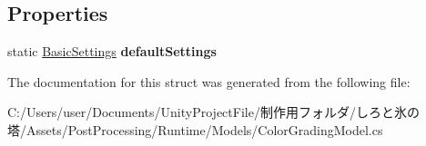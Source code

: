 \subsection*{Properties}
\begin{DoxyCompactItemize}
\item 
\mbox{\label{struct_unity_engine_1_1_post_processing_1_1_color_grading_model_1_1_basic_settings_a3c6d62a952263436102ea72c64701adc}} 
static \hyperlink{struct_unity_engine_1_1_post_processing_1_1_color_grading_model_1_1_basic_settings}{Basic\+Settings} {\bfseries default\+Settings}
\end{DoxyCompactItemize}


The documentation for this struct was generated from the following file\+:\begin{DoxyCompactItemize}
\item 
C\+:/\+Users/user/\+Documents/\+Unity\+Project\+File/制作用フォルダ/しろと氷の塔/\+Assets/\+Post\+Processing/\+Runtime/\+Models/Color\+Grading\+Model.\+cs\end{DoxyCompactItemize}
